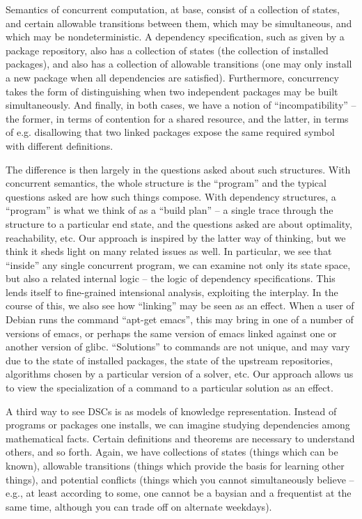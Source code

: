 \documentclass[hoptionsi,review,screen,format=sigconf]{acmart}
\theoremstyle{definition}
\begin{document}
Semantics of concurrent computation, at base, consist of a collection of states, and certain allowable transitions between them, which may be simultaneous, and which may be nondeterministic. A dependency specification, such as given by a package repository, also has a collection of states (the collection of installed packages), and also has a collection of allowable transitions (one may only install a new package when all dependencies are satisfied). Furthermore, concurrency takes the form of distinguishing when two independent packages may be built simultaneously. And finally, in both cases, we have a notion of ``incompatibility'' -- the former, in terms of contention for a shared resource, and the latter, in terms of e.g. disallowing that two linked packages expose the same required symbol with different definitions.

The difference is then largely in the questions asked about such structures. With concurrent semantics, the whole structure is the ``program'' and the typical questions asked are how such things compose. With dependency structures, a ``program'' is what we think of as a ``build plan'' -- a single trace through the structure to a particular end state, and the questions asked are about optimality, reachability, etc. Our approach is inspired by the latter way of thinking, but we think it sheds light on many related issues as well. In particular, we see that ``inside'' any single concurrent program, we can examine not only its state space, but also a related internal logic -- the logic of dependency specifications. This lends itself to fine-grained intensional analysis, exploiting the interplay. In the course of this, we also see how ``linking'' may be seen as an effect. When a user of Debian runs the command ``apt-get emacs'', this may bring in one of a number of versions of emacs, or perhaps the same version of emacs linked against one or another version of glibc. ``Solutions'' to commands are not unique, and may vary due to the state of installed packages, the state of the upstream repositories, algorithms chosen by a particular version of a solver, etc. Our approach allows us to view the specialization of a command to a particular solution as an effect.

A third way to see DSCs is as models of knowledge representation. Instead of programs or packages one installs, we can imagine studying dependencies among mathematical facts. Certain definitions and theorems are necessary to understand others, and so forth. Again, we have collections of states (things which can be known), allowable transitions (things which provide the basis for learning other things), and potential conflicts (things which you cannot simultaneously believe -- e.g., at least according to some, one cannot be a baysian and a frequentist at the same time, although you can trade off on alternate weekdays).
\end{document}

